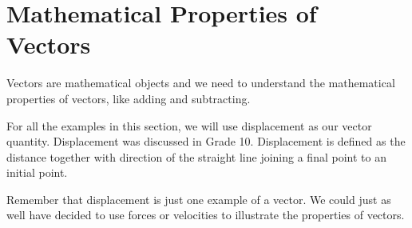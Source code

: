 
\section{Mathematical Properties of Vectors}

%
%
%


Vectors are mathematical objects and we need to understand the mathematical properties of vectors, like adding and subtracting.

For all the examples in this section, we will use displacement as our vector quantity. Displacement was discussed in
Grade 10.%
Displacement is defined as the distance together with direction of the straight line joining a final point to an initial point.

Remember that displacement is just one example of a vector. We could just as well have decided to use forces or velocities to illustrate the properties of vectors.

